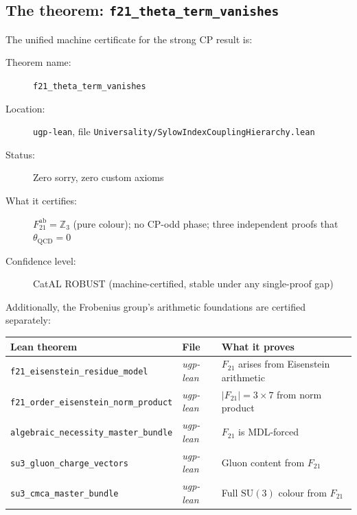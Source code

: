 \documentclass[11pt,a4paper]{article}
\newcommand{\lean}[1]{\texttt{#1}}
\begin{document}
\subsection{The theorem: \lean{f21\_theta\_term\_vanishes}}

The unified machine certificate for the strong CP result is:

\begin{tcolorbox}[colback=boxyellow,colframe=yellow!60!black,
  title={Lean 4 certificate: \lean{f21\_theta\_term\_vanishes}}]
\begin{description}
  \item[Theorem name:] \lean{f21\_theta\_term\_vanishes}
  \item[Location:] \texttt{ugp-lean}, file \texttt{Universality/SylowIndexCouplingHierarchy.lean}
  \item[Status:] Zero sorry, zero custom axioms
  \item[What it certifies:] $F_{21}^{\mathrm{ab}} = \mathbb{Z}_3$ (pure colour); no CP-odd phase;
    three independent proofs that $\theta_{\mathrm{QCD}} = 0$
  \item[Confidence level:] CatAL ROBUST (machine-certified, stable under any single-proof gap)
\end{description}
\end{tcolorbox}

\medskip
Additionally, the Frobenius group's arithmetic foundations are certified separately:

\begin{center}
\begin{tabular}{lll}
\toprule
Lean theorem & File & What it proves \\
\midrule
\lean{f21\_eisenstein\_residue\_model} & \textit{ugp-lean} & $F_{21}$ arises from Eisenstein arithmetic \\
\lean{f21\_order\_eisenstein\_norm\_product} & \textit{ugp-lean} & $|F_{21}| = 3 \times 7$ from norm product \\
\lean{algebraic\_necessity\_master\_bundle} & \textit{ugp-lean} & $F_{21}$ is MDL-forced \\
\lean{su3\_gluon\_charge\_vectors} & \textit{ugp-lean} & Gluon content from $F_{21}$ \\
\lean{su3\_cmca\_master\_bundle} & \textit{ugp-lean} & Full $\mathrm{SU}(3)$ colour from $F_{21}$ \\
\bottomrule
\end{tabular}
\end{center}
\end{document}
